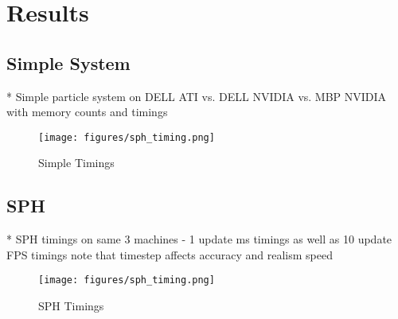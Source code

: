 \chapter{Results}
\section{Simple System}
* Simple particle system on DELL ATI vs. DELL NVIDIA vs. MBP NVIDIA
    with memory counts and timings


\begin{figure}[!htc]
 		\centering
		\texttt{[image: figures/sph\_timing.png]}
		\label{fig:logic}
        \caption{ Simple Timings }
\end{figure}



\section{SPH}
* SPH timings on same 3 machines - 1 update ms timings 
    as well as 10 update FPS timings
    note that timestep affects accuracy and realism speed

\begin{figure}[!htc]
 		\centering
		\texttt{[image: figures/sph\_timing.png]}
		\label{fig:logic}
        \caption{ SPH Timings }
\end{figure}


